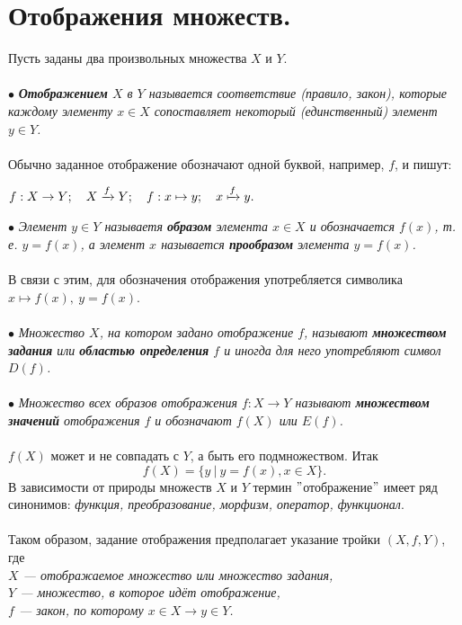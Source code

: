 \section{Отображения множеств.}
Пусть заданы два произвольных множества $X$ и $Y$.\\\\
$\bullet$ \textit{\textbf{Отображением} $X$ в $Y$ называется соответствие (правило, закон), которые каждому элементу $x \in X$ сопоставляет некоторый (единственный) элемент $y \in Y$.} \\\\
Обычно заданное отображение обозначают одной буквой, например, $f$, и пишут:
\begin{center}
	$f : X \rightarrow Y;\quad X \xrightarrow{f} Y;\quad f: x \mapsto y; \quad x \xmapsto{f} y.$
\end{center}
$\bullet$ \textit{Элемент $y \in Y$ называетя \textbf{образом} элемента $x \in X$ и обозначается $f(x)$, т. е. $y=f(x)$, а элемент $x$ называется \textbf{прообразом} элемента $y=f(x)$.} \\\\
В связи с этим, для обозначения отображения употребляется символика $x \mapsto f(x), \: y=f(x)$.\\\\
$\bullet$ \textit{Множество $X$, на котором задано отображение $f$, называют \textbf{множеством задания} или \textbf{областью определения} $f$ и иногда для него употребляют символ $D(f)$.} \\\\
$\bullet$ \textit{Множество всех образов отображения $f : X \rightarrow Y$ называют \textbf{множеством значений} отображения $f$ и обозначают $f(X)$ или $E(f)$.} \\\\
$f(X)$ может и не совпадать с $Y$, а быть его подмножеством. Итак $$f(X)=\{ y\:|\:y=f(x), x\in X\}.$$
В зависимости от природы множеств $X$ и $Y$ термин $"$отображение$"$ имеет ряд синонимов: \textit{функция, преобразование, морфизм, оператор, функционал}.\\\\
Таком образом, задание отображения предполагает указание тройки $(X, f, Y)$, где\\
\textit{$X$ --- отображаемое множество или множество задания,\\
	$Y$ --- множество, в которое идёт отображение,\\
	$f$ --- закон, по которому $x \in X \rightarrow y \in Y$.}
